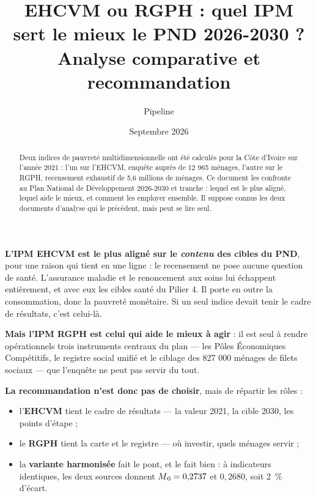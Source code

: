 \documentclass[11pt,a4paper]{article}
\title{\bfseries EHCVM ou RGPH : quel IPM sert le mieux le PND 2026-2030 ?\\[4pt]
\large Analyse comparative et recommandation}
\author{Pipeline \col{PythonIPM}}
\date{Septembre 2026}
\begin{document}
\maketitle

\begin{abstract}
\noindent Deux indices de pauvreté multidimensionnelle ont été calculés pour la Côte d'Ivoire sur
l'année 2021 : l'un sur l'EHCVM, enquête auprès de 12 965 ménages, l'autre sur le RGPH, recensement
exhaustif de 5,6 millions de ménages. Ce document les confronte au Plan National de Développement
2026-2030 et tranche : lequel est le plus aligné, lequel aide le mieux, et comment les employer
ensemble. Il suppose connus les deux documents d'analyse qui le précèdent, mais peut se lire seul.
\end{abstract}

\begin{retenir}
\textbf{L'IPM EHCVM est le plus aligné sur le \emph{contenu} des cibles du PND}, pour une raison
qui tient en une ligne : le recensement ne pose aucune question de santé. L'assurance maladie et le
renoncement aux soins lui échappent entièrement, et avec eux les cibles santé du Pilier 4. Il porte
en outre la consommation, donc la pauvreté monétaire. Si un seul indice devait tenir le cadre de
résultats, c'est celui-là.

\textbf{Mais l'IPM RGPH est celui qui aide le mieux à agir} : il est seul à rendre opérationnels
trois instruments centraux du plan --- les Pôles Économiques Compétitifs, le registre social unifié
et le ciblage des 827 000 ménages de filets sociaux --- que l'enquête ne peut pas servir du tout.

\textbf{La recommandation n'est donc pas de choisir}, mais de répartir les rôles :
\begin{itemize}
  \item l'\textbf{EHCVM} tient le cadre de résultats --- la valeur 2021, la cible 2030, les points
        d'étape ;
  \item le \textbf{RGPH} tient la carte et le registre --- où investir, quels ménages servir ;
  \item la \textbf{variante harmonisée} fait le pont, et le fait bien : à indicateurs identiques,
        les deux sources donnent $M\textsubscript{0} = 0{,}2737$ et $0{,}2680$, soit 2~\% d'écart.
\end{itemize}
\end{retenir}

\tableofcontents
\bigskip
\end{document}

